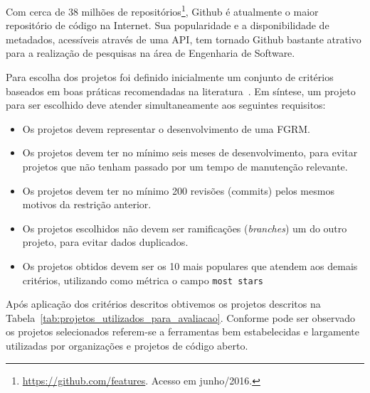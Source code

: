 Com cerca de 38 milhões de
repositórios\footnote{\url{https://github.com/features}. Acesso em junho/2016.},
Github é atualmente o maior repositório de código na Internet. Sua popularidade
e a disponibilidade de metadados, acessíveis através de uma API, tem tornado
Github bastante atrativo para a realização de pesquisas na área de Engenharia de
Software.

Para escolha dos projetos foi definido inicialmente um conjunto de critérios
baseados em boas práticas recomendadas na literatura~\cite{Bird2009}. Em
síntese, um projeto para ser escolhido deve atender simultaneamente
aos seguintes requisitos:

\begin{itemize}
	\item Os projetos devem representar o desenvolvimento de uma FGRM\@.
	\item Os projetos devem ter no mínimo seis meses de desenvolvimento, para
		evitar projetos que não tenham passado por um tempo de manutenção
		relevante.
	\item Os projetos devem  ter  no  mínimo  200  revisões (commits)  pelos
		mesmos motivos  da restrição anterior.
	\item Os projetos escolhidos não devem ser ramificações (\textsl{branches}) um
		do outro projeto, para evitar dados duplicados.
	\item Os projetos obtidos devem ser os 10 mais populares que atendem aos
		demais critérios, utilizando como métrica o campo \texttt{most stars}
\end{itemize}

Após aplicação dos critérios descritos obtivemos os projetos descritos na
Tabela~\ref{tab:projetos_utilizados_para_avaliacao}. Conforme pode ser observado
os projetos selecionados referem-se a ferramentas bem estabelecidas e largamente
utilizadas por organizações e projetos de código aberto.

\begin{table}[htpb]
\centering
{}
\caption{Projetos utilizados no levantamento com profissionais. Os dados
	apresentados tem como referência 07/03/2017.}
\label{tab:projetos_utilizados_para_avaliacao}
\end{table}


